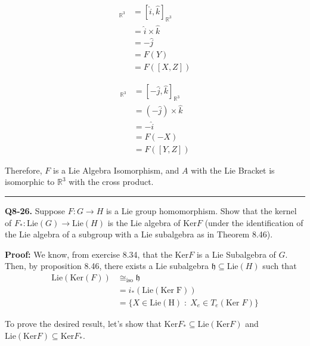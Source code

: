 \documentclass{article}
\newcommand{\R}{\mathbb{R}}
\begin{document}
\begin{align*}
  [F(X), F(Z)]_{\R^3} &= [\hat{i}, \hat{k}]_{\R^3} \\
  &= \hat{i} \times \hat{k} \\
  &= -\hat{j} \\
  &= F(Y) \\
  &= F\left([X,Z]\right)
\end{align*}


\begin{align*}
  [F(Y), F(Z)]_{\R^3} &= [-\hat{j}, \hat{k}]_{\R^3} \\
  &= (-\hat{j}) \times \hat{k} \\
  &= -\hat{i} \\
  &= F(-X) \\
  &= F\left([Y,Z]\right)
\end{align*}

Therefore, $F$ is a Lie Algebra Isomorphism, and $A$ with the Lie Bracket is isomorphic to $\R^3$ with the cross product.


\vskip 0.5cm
\hrule 
\vskip 0.5cm




\textbf{Q8-26.} Suppose $F : G \rightarrow H$ is a Lie group homomorphism. Show that the kernel of $F_* : \mathrm{Lie}(G) \rightarrow \mathrm{Lie}(H)$ is the Lie algebra of $\mathrm{Ker}F$ (under the identification of the Lie algebra of a subgroup with a Lie subalgebra as in Theorem 8.46). 

\vskip 0.5cm
\textbf{Proof:} We know, from exercise 8.34, that the $\mathrm{Ker}F$ is a Lie Subalgebra of $G$. Then, by proposition 8.46, there exists a Lie subalgebra $\mathfrak{h} \subseteq \mathrm{Lie}(H)$ such that 
\begin{align*}
  \mathrm{Lie}\left(\mathrm{Ker}(F)\right) &\cong_{\text{iso}} \mathfrak{h} \\
  &= i_*\left(\mathrm{Lie}\left(\mathrm{Ker\;F}\right)\right) \\
  &= \{ X \in \mathrm{Lie(H)} \;:\; X_e \in T_e\left(\mathrm{Ker}\; F\right) \}
\end{align*}

To prove the desired result, let's show that $\mathrm{Ker} F_* \subseteq \mathrm{Lie}(\mathrm{Ker} F)$ and $\mathrm{Lie}(\mathrm{Ker} F) \subseteq \mathrm{Ker} F_*$.
\end{document}
